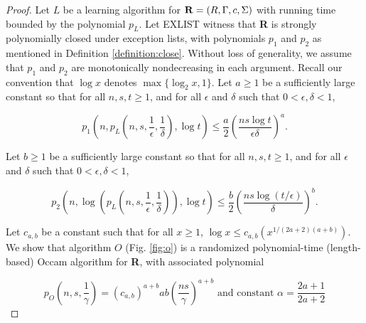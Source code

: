 \documentclass[12pt]{article}
\begin{document}
\begin{proof}
Let $L$ be a learning algorithm for ${\bf R} = (R, \Gamma, c, \Sigma)$ with running time bounded by the polynomial $p_L$. Let EXLIST witness that {\bf R} is strongly polynomially closed under exception lists, with polynomials $p_1$ and $p_2$ as mentioned in Definition \ref{definition:close}. Without loss of generality, we assume that $p_1$ and $p_2$ are monotonically nondecreasing in each argument. Recall our convention that $\log x$ denotes $\max \{ \log_2 x, 1\}$. Let $a \ge 1$ be a sufficiently large constant so that for all $n, s, t \ge 1$, and for all $\epsilon$ and $\delta$ such that $0 < \epsilon, \delta < 1$,

\begin{equation*}
p_1(n, p_L(n, s, \frac {1}{\epsilon}, \frac {1}{\delta}), \log t) \le \frac {a}{2} (\frac{ns \log t}{\epsilon \delta})^a.
\end{equation*}

Let $b \ge 1$ be a sufficiently large constant so that for all $n, s, t \ge 1$, and for all $\epsilon$ and $\delta$ such that $0 < \epsilon, \delta < 1$,

\begin{equation*}
p_2(n, \log (p_L(n, s, \frac {1}{\epsilon}, \frac {1}{\delta})), \log t) \le \frac {b}{2} (\frac{ns \log (t / \epsilon)}{\delta})^b.
\end{equation*}

Let $c_{a,b}$ be a constant such that for all $x \ge 1$, $\log x \le c_{a,b} (x^{1/(2a + 2)(a + b)})$. \\

We show that algorithm $O$ (Fig. \ref{fig:o}) is a randomized polynomial-time (length-based) Occam algorithm for {\bf R}, with associated polynomial

\begin{equation*}
p_O(n, s, \frac {1}{\gamma}) = (c_{a,b})^{a+b}ab(\frac{ns}{\gamma})^{a+b} \text {    and constant    } \alpha = \frac {2a + 1}{2a + 2}
\end{equation*}


\end{proof}
\end{document}
